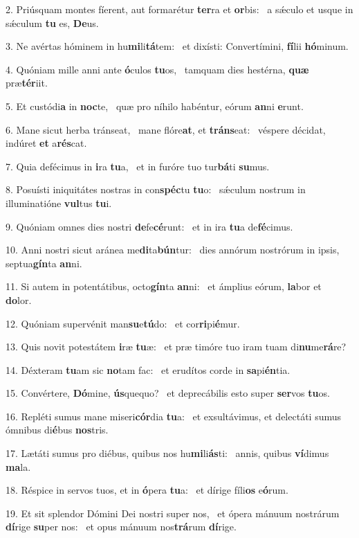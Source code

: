 2. Priúsquam montes fíerent, aut formarétur \textbf{ter}ra et \textbf{or}bis: \ast\  a sǽculo et usque in sǽculum \textbf{tu} es, \textbf{De}us.\

3. Ne avértas hóminem in hu\textbf{mi}li\textbf{tá}tem: \ast\  et dixísti: Convertímini, \textbf{fí}lii \textbf{hó}minum.\

4. Quóniam mille anni ante \textbf{ó}culos \textbf{tu}os, \ast\  tamquam dies hestérna, \textbf{quæ} præ\textbf{tér}iit.\

5. Et custódi\textbf{a} in \textbf{noc}te, \ast\  quæ pro níhilo habéntur, eórum \textbf{an}ni \textbf{e}runt.\

6. Mane sicut herba tránseat, \dag\  mane flóre\textbf{at}, et \textbf{tráns}eat: \ast\  véspere décidat, indúret \textbf{et} a\textbf{rés}cat.\

7. Quia defécimus in \textbf{i}ra \textbf{tu}a, \ast\  et in furóre tuo tur\textbf{bá}ti \textbf{su}mus.\

8. Posuísti iniquitátes nostras in con\textbf{spéc}tu \textbf{tu}o: \ast\  sǽculum nostrum in illuminatióne \textbf{vul}tus \textbf{tu}i.\

9. Quóniam omnes dies nostri \textbf{de}fe\textbf{cé}runt: \ast\  et in ira \textbf{tu}a de\textbf{fé}cimus.\

10. Anni nostri sicut aránea me\textbf{di}ta\textbf{bún}tur: \ast\  dies annórum nostrórum in ipsis, septua\textbf{gín}ta \textbf{an}ni.\

11. Si autem in potentátibus, octo\textbf{gín}ta \textbf{an}ni: \ast\  et ámplius eórum, \textbf{la}bor et \textbf{do}lor.\

12. Quóniam supervénit man\textbf{su}e\textbf{tú}do: \ast\  et cor\textbf{ri}pi\textbf{é}mur.\

13. Quis novit potestátem \textbf{i}ræ \textbf{tu}æ: \ast\  et præ timóre tuo iram tuam di\textbf{nu}me\textbf{rá}re?\

14. Déxteram \textbf{tu}am sic \textbf{no}tam fac: \ast\  et erudítos corde in \textbf{sa}pi\textbf{én}tia.\

15. Convértere, \textbf{Dó}mine, \textbf{ús}quequo? \ast\  et deprecábilis esto super \textbf{ser}vos \textbf{tu}os.\

16. Repléti sumus mane miseri\textbf{cór}dia \textbf{tu}a: \ast\  et exsultávimus, et delectáti sumus ómnibus di\textbf{é}bus \textbf{nos}tris.\

17. Lætáti sumus pro diébus, quibus nos hu\textbf{mi}li\textbf{ás}ti: \ast\  annis, quibus \textbf{ví}dimus \textbf{ma}la.\

18. Réspice in servos tuos, et in \textbf{ó}pera \textbf{tu}a: \ast\  et dírige fíli\textbf{os} e\textbf{ó}rum.\

19. Et sit splendor Dómini Dei nostri super nos, \dag\  et ópera mánuum nostrárum \textbf{dí}rige \textbf{su}per nos: \ast\  et opus mánuum nos\textbf{trá}rum \textbf{dí}rige.\

